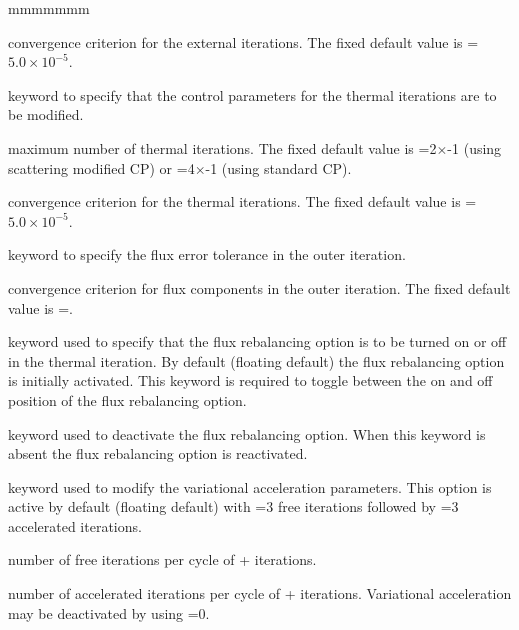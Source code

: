 \begin{ListeDeDescription}{mmmmmmm}
\item[\dusa{epsout}] convergence criterion for the external iterations. The
fixed default value is =$5.0\times 10^{-5}$.

\item[\moc{THER}] keyword to specify that the control parameters for the
thermal iterations are to be modified.

\item[\dusa{maxthr}] maximum number of thermal iterations. The fixed default
value is =2$\times$-1 (using scattering modified CP)
or =4$\times$-1 (using standard CP).

\item[\dusa{epsthr}] convergence criterion for the thermal iterations. The
fixed default value is =$5.0\times 10^{-5}$.

\item[\moc{UNKT}] keyword to specify the flux error tolerance in
the outer iteration.

\item[\dusa{epsunk}] convergence criterion for flux components in the outer
iteration. The fixed default value is =.

\item[\moc{REBA}] keyword used to specify that the flux rebalancing option is
to be turned on or off in the thermal iteration. By default (floating default)
the flux rebalancing option is initially activated. This keyword is required to
toggle between the on and off position of the flux rebalancing option. 

\item[\moc{OFF}] keyword used to deactivate the flux rebalancing option. When
this keyword is absent the flux rebalancing option is reactivated.

\item[\moc{ACCE}] keyword used to modify the variational acceleration
parameters. This option is active by default (floating default) with
=3 free iterations followed by =3 accelerated
iterations. 

\item[\dusa{nlibre}] number of free iterations per cycle of
+ iterations. 

\item[\dusa{naccel}] number of accelerated iterations per cycle of
+ iterations. Variational acceleration may be
deactivated by using =0.

\end{ListeDeDescription}
\clearpage

